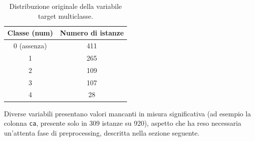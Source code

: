 \documentclass[12pt]{article}
\begin{document}
\begin{table}[H]
\centering
\begin{tabular}{cc}
\toprule
\textbf{Classe (num)} & \textbf{Numero di istanze} \\
\midrule
0 (assenza) & 411 \\
1 & 265 \\
2 & 109 \\
3 & 107 \\
4 & 28 \\
\bottomrule
\end{tabular}
\caption{Distribuzione originale della variabile target multiclasse.}
\label{tab:target_dist}
\end{table}

Diverse variabili presentano valori mancanti in misura significativa (ad esempio la colonna \texttt{ca}, presente solo in 309 istanze su 920), aspetto che ha reso necessaria un'attenta fase di preprocessing, descritta nella sezione seguente.
\end{document}
